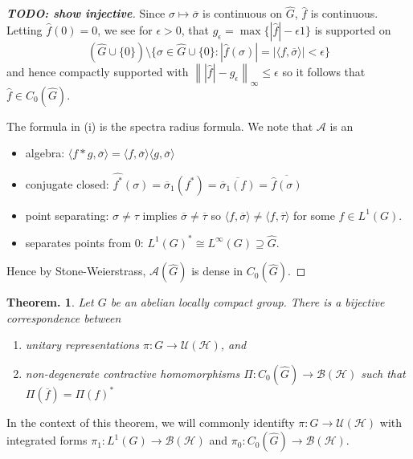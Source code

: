 \documentclass[11pt, a4paper]{memoir}
\newcommand{\norm}[1]{\ensuremath{\left\lVert#1\right\rVert}}
\theoremstyle{change}
\newtheorem{theorem}{Theorem.}[section]
\theoremstyle{plain}
\theoremstyle{nonumberplain}
\newtheorem{proof}{Proof}
\newcommand{\TODO}[1]{[\textit{\textbf{TODO: #1}}]}
\numberwithin{equation}{section}
\begin{document}
\begin{proof}
    \TODO{show injective}

    Since $\sigma\mapsto\overline{\sigma}$ is continuous on $\widehat{G}$, $\hat{f}$ is continuous.
    Letting $\hat{f}(0)=0$, we see for $\epsilon>0$, that $g_\epsilon=\max\{|\hat{f}|-\epsilon 1\}$ is supported on
    \begin{equation*}
        (\widehat{G}\cup\{0\})\setminus\{\sigma\in\widehat{G}\cup\{0\}:|\hat{f}(\sigma)|=|\langle f,\overline{\sigma}\rangle|<\epsilon\}
    \end{equation*}
    and hence compactly supported with $\norm{|\hat{f}|-g_\epsilon}_\infty\leq\epsilon$ so it follows that $\hat{f}\in C_0(\widehat{G})$.

    The formula in (i) is the spectra radius formula.
    We note that $\mathcal{A}$ is an
    \begin{itemize}[nl]
        \item algebra: $\langle f*g,\overline{\sigma}\rangle=\langle f,\overline{\sigma}\rangle\langle g,\overline{\sigma}\rangle$
        \item conjugate closed: $\widehat{f^*}(\sigma)=\overline{\sigma}_1(f^*)=\overline{\overline{\sigma}_1(f)}=\overline{\hat{f}(\sigma)}$
        \item point separating: $\sigma\neq\tau$ implies $\overline{\sigma}\neq\overline{\tau}$ so $\langle f,\overline{\sigma}\rangle\neq\langle f,\overline{\tau}\rangle$ for some $f\in L^1(G)$.
        \item separates points from $0$: $L^1(G)^*\cong L^\infty(G)\supseteq\hat{G}$.
    \end{itemize}
    Hence by Stone-Weierstrass, $\mathcal{A}(\widehat{G})$ is dense in $C_0(\widehat{G})$.

\end{proof}
\begin{theorem}
    Let $G$ be an abelian locally compact group.
    There is a bijective correspondence between
    \begin{enumerate}[nl]
        \item unitary representations $\pi:G\to\mathcal{U}(\mathcal{H})$, and
        \item non-degenerate contractive homomorphisms $\Pi:C_0(\widehat{G})\to\mathcal{B}(\mathcal{H})$ such that $\Pi(\overline{f})=\Pi(f)^*$
    \end{enumerate}
\end{theorem}
In the context of this theorem, we will commonly identifty $\pi:G\to\mathcal{U}(\mathcal{H})$ with integrated forms $\pi_1:L^1(G)\to\mathcal{B}(\mathcal{H})$ and $\pi_0:C_0(\widehat{G})\to\mathcal{B}(\mathcal{H})$.
\end{document}
